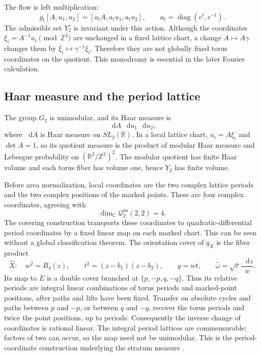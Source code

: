 \documentclass[11pt,a4paper]{article}
\numberwithin{equation}{section}
\theoremstyle{definition}
\theoremstyle{remark}
\DeclareMathOperator{\diag}{diag}
\newcommand{\dd}{\mathop{}\!\mathrm d}
\newcommand{\RR}{\mathbb R}
\newcommand{\CC}{\mathbb C}
\newcommand{\ZZ}{\mathbb Z}
\begin{document}
The flow is left multiplication:
\begin{equation}
 g_t[A,u_1,u_2]
   =[a_tA,a_tu_1,a_tu_2],
 \qquad a_t=\diag(e^t,e^{-t}).
 \label{eq:genus2homflow}
\end{equation}
The admissible set $Y_2^\circ$ is invariant under this action.
Although the coordinates $\xi_i=A^{-1}u_i\pmod{\ZZ^2}$ are
unchanged in a fixed lattice chart, a change $A\mapsto A\gamma$
changes them by $\xi_i\mapsto\gamma^{-1}\xi_i$.  Therefore they
are not globally fixed torus coordinates on the quotient.
This monodromy is essential in the later Fourier calculation.

\subsection{Haar measure and the period lattice}
\label{subsec:genus2haarmeasure}

The group $G_2$ is unimodular, and its Haar measure is
\[
 \dd A\,\dd u_1\,\dd u_2,
\]
where $\dd A$ is Haar measure on $SL_2(\RR)$.
In a local lattice chart, $u_i=A\xi_i$ and $\det A=1$, so its
quotient measure is the product of modular Haar measure and
Lebesgue probability on $(\RR^2/\ZZ^2)^2$.
The modular quotient has finite Haar volume and each torus fiber
has volume one, hence $Y_2$ has finite volume.

Before area normalization, local coordinates are the two complex
lattice periods and the two complex positions of the marked
points.  These are four complex coordinates, agreeing with
\[
 \dim_{\CC}\mathcal Q^{\mathrm{ns}}_2(2,2)=4.
\]
The covering construction transports these coordinates to
quadratic-differential period coordinates by a fixed linear map
on each marked chart.  This can be seen without a global
classification theorem.  The orientation cover of $q_X$ is the
fiber product
\[
 \widehat X:\quad
 w^2=B_4(z),\qquad t^2=(z-b_1)(z-b_2),
 \qquad y=wt,
 \qquad \widehat\omega=\sqrt c\,\frac{\dd z}{w}.
\]
Its map to $E$ is a double cover branched at
$\{p,-p,q,-q\}$.  Thus its relative periods are integral linear
combinations of torus periods and marked-point positions, after
paths and lifts have been fixed.  Transfer on absolute cycles and
paths between $p$ and $-p$, or between $q$ and $-q$, recover the
torus periods and twice the point positions, up to periods.
Consequently the inverse change of coordinates is rational
linear.  The integral period lattices are commensurable; factors
of two can occur, so the map need not be unimodular.  This is the
period-coordinate construction underlying the stratum measure
\cite[Sections~1.1.1--1.1.2]{LanneauComponents}.
\end{document}
